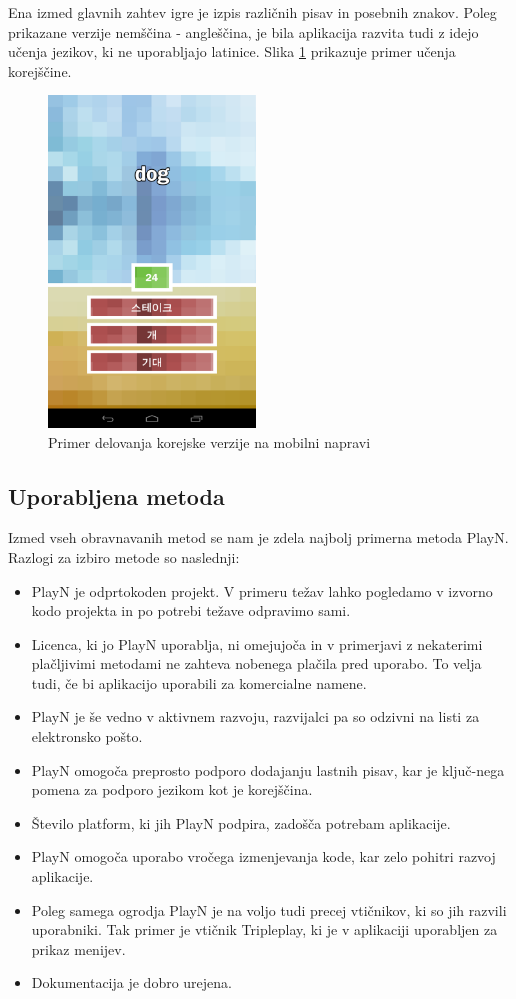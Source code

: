 Ena izmed glavnih zahtev igre je izpis različnih pisav in posebnih znakov. Poleg prikazane verzije nemščina - angleščina, je bila aplikacija razvita tudi z idejo učenja jezikov, ki ne uporabljajo latinice. Slika \ref{korean} prikazuje primer učenja korejščine. 

\begin{figure}
\begin{center}
\includegraphics[width=5.5cm]{pic/defg-korean.png}
\end{center}
\caption{Primer delovanja korejske verzije na mobilni napravi}
\label{korean}
\end{figure} 

\subsection{Uporabljena metoda}

Izmed vseh obravnavanih metod se nam je zdela najbolj primerna metoda PlayN. Razlogi za izbiro metode so naslednji:

\begin{itemize}
\item PlayN je odprtokoden projekt. V primeru težav lahko pogledamo v izvorno kodo projekta in po potrebi težave odpravimo sami.
\item Licenca, ki jo PlayN uporablja, ni omejujoča in v primerjavi z nekaterimi plačljivimi metodami ne zahteva nobenega plačila pred uporabo. To velja tudi, če bi aplikacijo uporabili za komercialne namene.
\item PlayN je še vedno v aktivnem razvoju, razvijalci pa so odzivni na listi za elektronsko pošto.
\item PlayN omogoča preprosto podporo dodajanju lastnih pisav, kar je ključ-nega pomena za podporo jezikom kot je korejščina.
\item Število platform, ki jih PlayN podpira, zadošča potrebam aplikacije.
\item PlayN omogoča uporabo vročega izmenjevanja kode, kar zelo pohitri razvoj aplikacije.
\item Poleg samega ogrodja PlayN je na voljo tudi precej vtičnikov, ki so jih razvili uporabniki. Tak primer je vtičnik Tripleplay, ki je v aplikaciji uporabljen za prikaz menijev.
\item Dokumentacija je dobro urejena.
\end{itemize}

